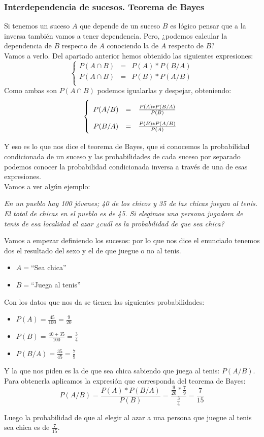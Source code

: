 \documentclass[a4paper,10pt,answers]{exam}
\newcommand\ddfrac[2]{\frac{\displaystyle #1}{\displaystyle #2}}
\begin{document}
\subsubsection{Interdependencia de sucesos. Teorema de Bayes}
Si tenemos un suceso $A$ que depende de un suceso $B$ es lógico pensar que a la inversa también vamos a tener dependencia. Pero, ¿podemos calcular la dependencia de $B$ respecto de $A$ conociendo la de $A$ respecto de $B$?\\
Vamos a verlo.
Del apartado anterior hemos obtenido las siguientes expresiones:
\[
\left\lbrace 
\begin{array}{ccc}
P(A \cap B) &= &P(A)*P(B/A)\\
P(A \cap B) &= &P(B)*P(A/B)\\
\end{array}\right. \]
Como ambas son $P(A \cap B)$ podemos igualarlas y despejar, obteniendo:
\[\left\lbrace 
\def\arraystretch{2}
\begin{array}{ccc}
P(A/B) &= &\frac{P(A)*P(B/A)}{P(B)}\\
P(B/A) &= &\frac{P(B)*P(A/B)}{P(A)}\\
\end{array}\right. \]

Y eso es lo que nos dice el teorema de Bayes, que si conocemos la probabilidad condicionada de un suceso y las probabilidades de cada suceso por separado podemos conocer la probabilidad condicionada inversa a través de una de esas expresiones.\\

Vamos a ver algún ejemplo:
\begin{questions}
\question\emph{En un pueblo hay 100 jóvenes; 40 de los chicos y 35 de las chicas juegan al tenis. El
total de chicas en el pueblo es de 45. Si elegimos una persona jugadora de tenis de esa localidad al azar ¿cuál es la probabilidad de que sea chica?}
\begin{solution}
Vamos a empezar definiendo los sucesos: por lo que nos dice el enunciado tenemos dos el resultado del sexo y el de que juegue o no al tenis.
\begin{itemize}
	\item $A=$``Sea chica''
	\item $B=$``Juega al tenis''
\end{itemize}
Con los datos que nos da se tienen las siguientes probabilidades:
\begin{itemize}
	\item $P(A) = \frac{45}{100} = \frac{9}{20}$
	\item $P(B) = \frac{40+35}{100} = \frac{3}{4}$
	\item $P(B/A) = \frac{35}{45} = \frac{7}{9}$
\end{itemize}
Y la que nos piden es la de que sea chica sabiendo que juega al tenis: $P(A/B)$. Para obtenerla aplicamos la expresión que corresponda del teorema de Bayes:
\[P(A/B) = \frac{P(A)*P(B/A)}{P(B)} = \ddfrac{\frac{9}{20} * \frac{7}{9}}{\frac{3}{4}} = \frac{7}{15}\]

Luego la probabilidad de que al elegir al azar a una persona que juegue al tenis sea chica es de $\frac{7}{15}$.
\end{solution}
\end{questions}
\end{document}
